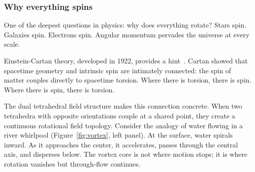 \documentclass[aps,prd,preprint,superscriptaddress,showpacs,preprintnumbers,amsmath,amssymb,nofootinbib]{revtex4-2}
\begin{document}
\subsubsection*{Why everything spins}

One of the deepest questions in physics: why does everything rotate? Stars spin. Galaxies spin. Electrons spin. Angular momentum pervades the universe at every scale.

Einstein-Cartan theory, developed in 1922, provides a hint~\cite{hehl1976}. Cartan showed that spacetime geometry and intrinsic spin are intimately connected: the spin of matter couples directly to spacetime torsion. Where there is torsion, there is spin. Where there is spin, there is torsion.

The dual tetrahedral field structure makes this connection concrete. When two tetrahedra with opposite orientations couple at a shared point, they create a continuous rotational field topology. Consider the analogy of water flowing in a river whirlpool (Figure~\ref{fig:vortex}, left panel). At the surface, water spirals inward. As it approaches the center, it accelerates, passes through the central axis, and disperses below. The vortex core is not where motion stops; it is where rotation vanishes but through-flow continues.
\end{document}
